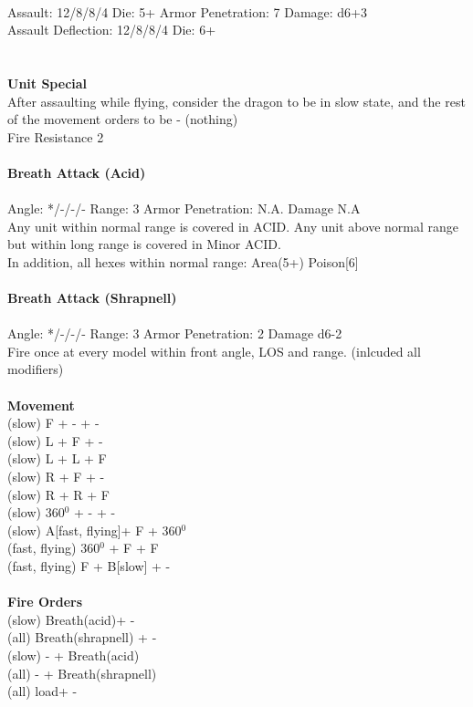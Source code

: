 \ \\
Assault: 12/8/8/4 Die: 5+ Armor Penetration: 7 Damage: d6+3 \\
Assault Deflection: 12/8/8/4 Die: 6+\\
\indent  \\
\ \\

{\bf Unit Special} \\
After assaulting while flying, consider the dragon to be in slow state, and the rest of the movement orders to be - (nothing) \\ Fire Resistance 2
\ \\
\ \\
{\bf Breath Attack (Acid) } \\
\ \\
Angle: */-/-/- Range: 3 Armor Penetration: N.A. Damage N.A \\
\indent Any unit within normal range is covered in ACID. Any unit above normal range but within long range is covered in Minor ACID. \\ In addition, all hexes within normal range: Area(5+) Poison[6] \\



\ \\
{\bf Breath Attack (Shrapnell) } \\
\ \\
Angle: */-/-/- Range: 3 Armor Penetration: 2 Damage d6-2 \\
\indent Fire once at every model within front angle, LOS and range. (inlcuded all modifiers) \\





\ \\ {\bf Movement } \\
(slow) F + - + - \\
(slow) L + F + - \\
(slow) L + L + F \\
(slow) R + F + - \\
(slow) R + R + F \\
(slow) 360$^0$ + - + - \\
(slow) A[fast, flying]+ F + 360$^0$ \\
(fast, flying) 360$^0$ + F + F \\
(fast, flying) F + B[slow] + - \\
\ \\ {\bf Fire Orders } \\
(slow) Breath(acid)+ -  \\
(all) Breath(shrapnell) + - \\
(slow) - + Breath(acid) \\
(all) - + Breath(shrapnell) \\
(all) load+ -  \\



